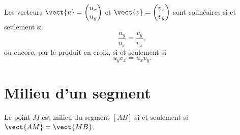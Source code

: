 \begin{propriete}
    Les vecteurs \( \vect{ u }=\begin{pmatrix}
        u_x    \\ 
        u_y    
    \end{pmatrix}\) et \( \vect{ v }=\begin{pmatrix}
        v_x    \\ 
        v_y    
    \end{pmatrix}\) sont colinéaires si et seulement si
    \begin{equation}
        \frac{ u_y }{ u_x }=\frac{ v_y }{ v_x },
    \end{equation}
    ou encore, par le produit en croix, si et seulement si
    \begin{equation}
        u_yv_x=u_xv_y.
    \end{equation}
\end{propriete}

\section{Milieu d'un segment}

\begin{propriete}\label{PropFHznUfJ}

        Le point \( M\) est milieu du segment \( [AB]\) si et seulement si \( \vect{ AM }=\vect{ MB }\).

        \begin{center}
   
        \end{center}

\end{propriete}
